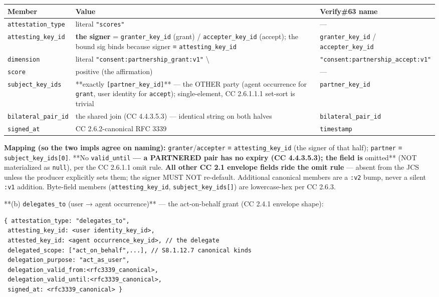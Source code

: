 \documentclass[11pt]{article}
\begin{document}
{\footnotesize
\begin{longtable}{|p{5.33cm}|p{5.33cm}|p{5.33cm}|}\hline
\textbf{Member} & \textbf{Value} & \textbf{Verify\#63 name} \\ \hline\endhead
\texttt{attestation\_type} & literal \texttt{"scores"} & — \\ \hline
\texttt{attesting\_key\_id} & \textbf{the signer} = \texttt{granter\_key\_id} (grant) / \texttt{accepter\_key\_id} (accept); the bound sig binds because signer ≡ \texttt{attesting\_key\_id} & \texttt{granter\_key\_id} / \texttt{accepter\_key\_id} \\ \hline
\texttt{dimension} & literal \texttt{"consent:partnership\_grant:v1"} \textbackslash{} & \texttt{"consent:partnership\_accept:v1"} \\ \hline
\texttt{score} & positive (the affirmation) & — \\ \hline
\texttt{subject\_key\_ids} & **exactly \texttt{[partner\_key\_id]}** — the OTHER party (agent occurrence for \texttt{grant}, user identity for \texttt{accept}); single-element, CC 2.6.1.1.1 set-sort is trivial & \texttt{partner\_key\_id} \\ \hline
\texttt{bilateral\_pair\_id} & the shared join (CC 4.4.3.5.3) — identical string on both halves & \texttt{bilateral\_pair\_id} \\ \hline
\texttt{signed\_at} & CC 2.6.2-canonical RFC 3339 & \texttt{timestamp} \\ \hline
\end{longtable}}


\textbf{Mapping (so the two impls agree on naming):} \texttt{granter}/\texttt{accepter} ≡ \texttt{attesting\_key\_id} (the signer of that half); \texttt{partner} ≡ \texttt{subject\_key\_ids[0]}. **No \texttt{valid\_until}\textbf{ — a PARTNERED pair has no expiry (CC 4.4.3.5.3); the field is }omitted** (NOT materialized as \texttt{null}), per the CC 2.6.1.1 omit rule. \textbf{All other CC 2.1 envelope fields ride the omit rule} — absent from the JCS unless the producer explicitly sets them; the signer MUST NOT re-default. Additional canonical members are a \texttt{:v2} bump, never a silent \texttt{:v1} addition. Byte-field members (\texttt{attesting\_key\_id}, \texttt{subject\_key\_ids[]}) are lowercase-hex per CC 2.6.3.


**(b) \texttt{delegates\_to} (user → agent occurrence)** — the act-on-behalf grant (CC 2.4.1 envelope shape):

\begin{lstlisting}
{ attestation_type: "delegates_to",
 attesting_key_id: <user identity_key_id>,
 attested_key_id: <agent occurrence_key_id>, // the delegate
 delegated_scope: ["act_on_behalf",...], // S8.1.12.7 canonical kinds
 delegation_purpose: "act_as_user",
 delegation_valid_from:<rfc3339_canonical>,
 delegation_valid_until:<rfc3339_canonical>,
 signed_at: <rfc3339_canonical> }
\end{lstlisting}
\end{document}
